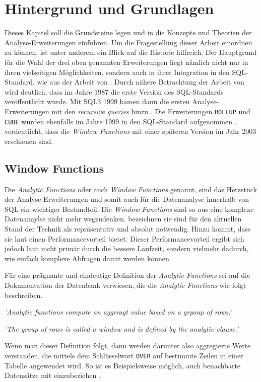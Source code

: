 \chapter{Hintergrund und Grundlagen}
\label{chap:hintergund_und_grundlagen} Dieses Kapitel soll die Grundsteine legen
und in die Konzepte und Theorien der Analyse-Erweiterungen einführen. Um die
Fragestellung dieser Arbeit einordnen zu können, ist unter anderem ein Blick auf
die Historie hilfreich. Der Hauptgrund für die Wahl der drei oben genannten
Erweiterungen liegt nämlich nicht nur in ihren vielseitigen Möglichkeiten, sondern
auch in ihrer Integration in den SQL-Standard, wie aus der Arbeit von \citet[S.~10]{grust2017advanced}.
Durch nähere Betrachtung der Arbeit von \cite{grust2017advanced} wird deutlich, dass
im Jahre 1987 die erste Version des SQL-Standards veröffentlicht wurde. Mit SQL3
1999 kamen dann die ersten Analyse-Erweiterungen mit den \textit{recursive
queries} hinzu \citep[S.~10]{grust2017advanced}. Die Erweiterungen \texttt{ROLLUP}
und \texttt{CUBE} wurden ebenfalls im Jahre 1999 in den SQL-Standard aufgenommen
\citep[Kapitel 9.12]{melton2001sql}. \citet[S.~10]{grust2017advanced} verdeutlicht,
dass die \textit{Window Functions} mit einer späteren Version im Jahr 2003 erschienen
sind.

\section{Window Functions}
\label{sec:window_functions} Die \textit{Analytic Functions} oder auch \textit{Window
Functions} genannt, sind das Herzstück der Analyse-Erweiterungen und somit auch
für die Datenanalyse innerhalb von SQL ein wichtiger Bestandteil. Die \textit{Window
Functions} sind so aus eine komplexe Datenanaylse nicht mehr wegzudenken. \citet[Abstract]{cao2012optimization}
bezeichnen sie sind für den aktuellen Stand der Technik als repräsentativ und absolut
notwendig. Hinzu kommt, dass sie laut \citet[Kapitel 8]{kellenberger2019expert} einen
Performancevorteil bietet. Dieser Performancevorteil ergibt sich jedoch laut
\citet[Kapitel 8]{kellenberger2019expert} nicht primär durch die bessere
Laufzeit, sondern vielmehr dadurch, wie einfach komplexe Abfragen damit werden
können.

Für eine prägnante und eindeutige Definition der \textit{Analytic Functions} sei
auf die Dokumentation der \citet{oracle} Datenbank verwiesen, die die \textit{Analytic
Functions} wie folgt beschreiben.
\begin{center}
	\textit{ 'Analytic functions compute an aggreagt value based on a grpoup of
	rows.' } \\ \cite{oracle}

	\textit{ 'The group of rows is called a window and is defined by the analytic-clause.'
	} \\ \cite{oracle}
\end{center}
Wenn man dieser Definition folgt, dann werden darunter also aggregierte Werte
verstanden, die mittels dem Schlüsselwort \texttt{OVER} auf bestimmte Zeilen in
einer Tabelle angewendet wird. So ist es Beispielsweise möglich, auch
benachbarte Datensätze mit einzubeziehen \citep{oracle}.


